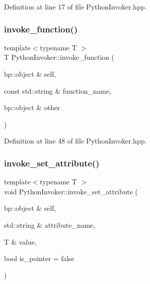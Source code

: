 Definition at line 17 of file Python\+Invoker.\+hpp.

\mbox{\label{class_python_invoker_a5cbaab517bb6935227d422376c1a797d}} 
\subsubsection{\texorpdfstring{invoke\_function()}{invoke\_function()}}
{\footnotesize\ttfamily template$<$typename T $>$ \\
T Python\+Invoker\+::invoke\+\_\+function (\begin{DoxyParamCaption}\item[{bp\+::object \&}]{self,  }\item[{const std\+::string \&}]{function\+\_\+name,  }\item[{bp\+::object \&}]{other }\end{DoxyParamCaption})\hspace{0.3cm}{\ttfamily [inline]}}



Definition at line 48 of file Python\+Invoker.\+hpp.

\mbox{\label{class_python_invoker_ad824d1fc84b3544824923a63fce3d385}} 
\subsubsection{\texorpdfstring{invoke\_set\_attribute()}{invoke\_set\_attribute()}}
{\footnotesize\ttfamily template$<$typename T $>$ \\
void Python\+Invoker\+::invoke\+\_\+set\+\_\+attribute (\begin{DoxyParamCaption}\item[{bp\+::object \&}]{self,  }\item[{std\+::string \&}]{attribute\+\_\+name,  }\item[{T \&}]{value,  }\item[{bool}]{is\+\_\+pointer = {\ttfamily false} }\end{DoxyParamCaption})\hspace{0.3cm}{\ttfamily [inline]}}



